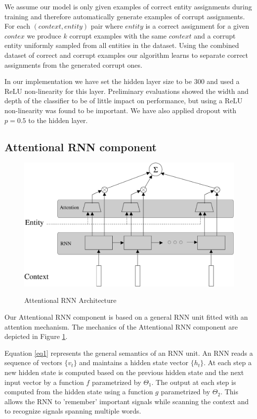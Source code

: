 \documentclass[11pt]{article}
\begin{document}
	We assume our model is only given examples of correct entity assignments during training and therefore automatically generate examples of corrupt assignments. For each $(context,entity)$ pair where $entity$ is a correct assignment for a given $contex$ we produce $k$ corrupt examples with the same $context$ and a corrupt entity uniformly sampled from all entities in the dataset. Using the combined dataset of correct and corrupt examples our algorithm learns to separate correct assignments from the generated corrupt ones.
	
	In our implementation we have set the hidden layer size to be 300 and used a ReLU non-linearity for this layer. Preliminary evaluations showed the width and depth of the classifier to be of little impact on performance, but using a ReLU non-linearity was found to be important. We have also applied dropout with $p=0.5$ to the hidden layer.
	
	\subsection{Attentional RNN component}
	
	\begin{figure}
		\centering 
		\caption{Attentional RNN Architecture}
		\includegraphics[scale=0.25]{diagrams/RNN_ATTN.pdf}
		\label{fig:arnn}
	\end{figure}	
	
	Our Attentional RNN component is based on a general RNN unit fitted with an attention mechanism. The mechanics of the Attentional RNN component are depicted in Figure \ref{fig:arnn}. 
		
	Equation \ref{eq1} represents the general semantics of an RNN unit. An RNN reads a sequence of vectors $\{v_t\}$ and maintains a hidden state vector $\{h_t\}$. At each step a new hidden state is computed based on the previous hidden state and the next input vector by a function $f$ parametrized by $\Theta_1$. The output at each step is computed from the hidden state using a function $g$ parametrized by $\Theta_2$. This allows the RNN to 'remember' important signals while scanning the context and to recognize signals spanning multiple words.
	
\end{document}
